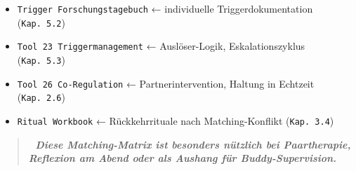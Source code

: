 \begin{itemize}
\tightlist
\item
  \texttt{T}\texttt{rigger}\texttt{\ F}\texttt{orschungstagebuch} ← individuelle Triggerdokumentation (\texttt{Kap.\ }\texttt{5.2})
\item
  \texttt{T}\texttt{ool}\texttt{\ }\texttt{23}\texttt{\ }\texttt{T}\texttt{riggermanagement} ← Auslöser-Logik, Eskalationszyklus (\texttt{Kap.\ }\texttt{5.3})
\item
  \texttt{T}\texttt{ool}\texttt{\ }\texttt{26}\texttt{\ C}\texttt{o}\texttt{-R}\texttt{egulation} ← Partnerintervention, Haltung in Echtzeit (\texttt{Kap.\ }\texttt{2.6})
\item
  \texttt{R}\texttt{itual}\texttt{\ W}\texttt{orkbook} ← Rückkehrrituale nach Matching-Konflikt (\texttt{Kap.\ }\texttt{3.4})
\end{itemize}

\begin{quote}
\emph{\textbf{📎 Diese Matching-Matrix ist besonders nützlich bei Paartherapie, Reflexion am Abend oder als Aushang für Buddy-Supervision.}}
\end{quote}


